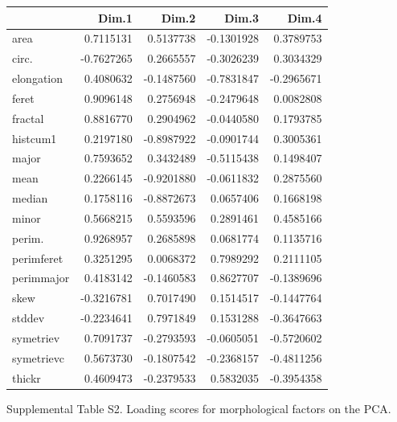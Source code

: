 \documentclass[
]{article}
\begin{document}
\begin{longtable}[]{@{}lrrrr@{}}
\toprule()
& Dim.1 & Dim.2 & Dim.3 & Dim.4 \\
\midrule()
\endhead
area & 0.7115131 & 0.5137738 & -0.1301928 & 0.3789753 \\
circ. & -0.7627265 & 0.2665557 & -0.3026239 & 0.3034329 \\
elongation & 0.4080632 & -0.1487560 & -0.7831847 & -0.2965671 \\
feret & 0.9096148 & 0.2756948 & -0.2479648 & 0.0082808 \\
fractal & 0.8816770 & 0.2904962 & -0.0440580 & 0.1793785 \\
histcum1 & 0.2197180 & -0.8987922 & -0.0901744 & 0.3005361 \\
major & 0.7593652 & 0.3432489 & -0.5115438 & 0.1498407 \\
mean & 0.2266145 & -0.9201880 & -0.0611832 & 0.2875560 \\
median & 0.1758116 & -0.8872673 & 0.0657406 & 0.1668198 \\
minor & 0.5668215 & 0.5593596 & 0.2891461 & 0.4585166 \\
perim. & 0.9268957 & 0.2685898 & 0.0681774 & 0.1135716 \\
perimferet & 0.3251295 & 0.0068372 & 0.7989292 & 0.2111105 \\
perimmajor & 0.4183142 & -0.1460583 & 0.8627707 & -0.1389696 \\
skew & -0.3216781 & 0.7017490 & 0.1514517 & -0.1447764 \\
stddev & -0.2234641 & 0.7971849 & 0.1531288 & -0.3647663 \\
symetriev & 0.7091737 & -0.2793593 & -0.0605051 & -0.5720602 \\
symetrievc & 0.5673730 & -0.1807542 & -0.2368157 & -0.4811256 \\
thickr & 0.4609473 & -0.2379533 & 0.5832035 & -0.3954358 \\
\bottomrule()
\end{longtable}

Supplemental Table S2. Loading scores for morphological factors on the
PCA.
\end{document}
